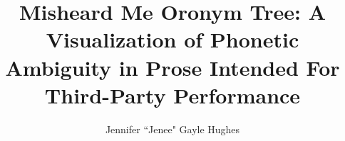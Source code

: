 \documentclass[12pt]{ucthesis}
\begin{document}

\title{Misheard Me Oronym Tree: A Visualization of Phonetic Ambiguity in Prose Intended For Third-Party Performance}
\author{Jennifer ``Jenee" Gayle Hughes}
  
 
     

\maketitle


%

\gdef \uniqueUsersPhaseOneUserStudy {12 }
\gdef \numResponsesPhaseOneUserStudy {72 }
\gdef \numOronymsPhaseOneUserStudy {56 }
\gdef \numForthRightOohOronymPhrases {10 }

\gdef \uniqueUsersPhaseTwoUserStudy {208 }
\gdef \uniqueUsersPhaseTwoUserStudyUSA {127 }

\gdef \numResponsesPhaseTwoUserStudy {851 }
\gdef \numResponsesPhaseTwoUserStudyUSA {489 }
\gdef \numResponsesPhaseTwoUserStudyIndia {239 }
\gdef \numResponsesPhaseTwoUserStudyEngland {37 }
\gdef \numResponsesPhaseTwoUserStudyCanada{35 }

\gdef \recordingsPhaseTwoUserStudy {15 }

\gdef \numTranscriptionsPerRecordingPhaseTwoUserStudy {30 to 60 }

\gdef \phaseTwoUserStudyTranscriptionsANiceCoalDower {45 }
\gdef \phaseTwoUserStudyTranscriptionsANiceColdHour {53 }
\gdef \phaseTwoUserStudyTranscriptionsANighScoldHour {49 }



\end{document}
